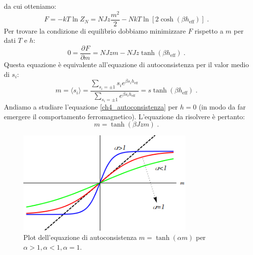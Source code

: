 \documentclass[10pt,a4paper]{report}
\theoremstyle{definition}
\newcommand{\pdev}[3][]{\frac{\partial^{#1} #2}{\partial #3^{#1}}}
\numberwithin{equation}{section}
\newcommand{\bra}{\langle}
\newcommand{\ket}{\rangle}
\begin{document}
da cui otteniamo:
\begin{equation}
F=-kT\ln Z_N=NJz\frac{m^2}{2}-NkT\ln\left[2\cosh(\beta h_{\mathrm{eff}})\right]\;.
\end{equation}
Per trovare la condizione di equilibrio dobbiamo minimizzare $F$ rispetto a $m$ per dati $T$ e $h$:
\begin{equation}
0=\pdev{F}{m}=NJzm-NJz\tanh(\beta h_{\mathrm{eff}})\;.
\end{equation}
Questa equazione è equivalente all'equazione di autoconsistenza per il valor medio di $s_i$:
\begin{equation}
m=\bra s_i\ket=\frac{\sum_{s_i=\pm 1}s_ie^{\beta s_ih_{\mathrm{eff}}}}{\sum_{s_i=\pm 1}e^{\beta s_ih_{\mathrm{eff}}}}=s\tanh(\beta h_{\mathrm{eff}})\;. \label{ch4_autoconsistenza}
\end{equation}
Andiamo a studiare l'equazione \eqref{ch4_autoconsistenza} per $h=0$ (in modo da far emergere il comportamento ferromagnetico). L'equazione da risolvere è pertanto:
\begin{equation}
m=\tanh(\beta Jzm)\;.
\end{equation}


\begin{figure}[h]
\centering
\includegraphics[width=250pt,keepaspectratio=true]{Addons/autocons.png}
\caption{\footnotesize{Plot dell'equazione di autoconsistenza $m=\tanh(\alpha m)$ per $\alpha>1,\alpha<1,\alpha=1$.}}
\end{figure}
\end{document}
